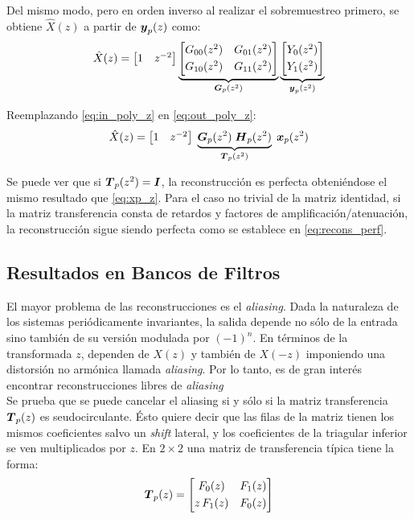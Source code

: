 		Del mismo modo, pero en orden inverso al realizar el sobremuestreo primero, se obtiene $\hat{X}(z)$ a partir de $\boldsymbol{y}_p(z)$ como:
		\begin{equation}
		\hat{X}(z) = \begin{bmatrix} 1 & z^{-2} \end{bmatrix} \underbrace{\begin{bmatrix} G_{00}(z^2) & G_{01}(z^2) \\[0.3em] G_{10}(z^2) & G_{11}(z^2) \end{bmatrix}}_{\boldsymbol{G}_p(z^2)} \underbrace{\begin{bmatrix} Y_0(z^2)\\[0.3em] Y_1(z^2) \end{bmatrix}}_{\boldsymbol{y}_p(z^2)} 
			\label{eq:out_poly_z}
		\end{equation}

		Reemplazando \eqref{eq:in_poly_z} en \eqref{eq:out_poly_z}:
		\begin{equation*}
		\hat{X}(z) = \begin{bmatrix} 1 & z^{-2} \end{bmatrix}\; \underbrace{\boldsymbol{G}_p(z^2) \; \boldsymbol{H}_p(z^2)}_{\boldsymbol{T}_p(z^2)} \; \boldsymbol{x}_p(z^2)
		\end{equation*}

		Se puede ver que si $\boldsymbol{T}_p(z^2) = \boldsymbol{I}$, la reconstrucción es perfecta obteniéndose el mismo resultado que \eqref{eq:xp_z}. Para el caso no trivial de la matriz identidad, si la matriz transferencia consta de retardos y factores de amplificación/atenuación, la reconstrucción sigue siendo perfecta como se establece en \eqref{eq:recons_perf}.

	\subsection{Resultados en Bancos de Filtros}
	El mayor problema de las reconstrucciones es el \emph{aliasing}. Dada la naturaleza de los sistemas periódicamente invariantes, la salida depende no sólo de la entrada sino también de su versión modulada por $(-1)^n$. En términos de la transformada $z$, dependen de $X(z)$ y también de $X(-z)$ imponiendo una distorsión no armónica llamada \emph{aliasing}. Por lo tanto, es de gran interés encontrar reconstrucciones libres de \emph{aliasing}\\

		Se prueba que se puede cancelar el aliasing si y sólo si la matriz transferencia $\boldsymbol{T}_p(z)$ es seudocirculante. Ésto quiere decir que las filas de la matriz tienen los mismos coeficientes salvo un \emph{shift} lateral, y los coeficientes de la triagular inferior se ven multiplicados por $z$. En $2\times 2$ una matriz de transferencia típica tiene la forma:
		\begin{equation*}
		\boldsymbol{T}_p(z) = \begin{bmatrix} F_0 (z) & F_1(z) \\[0.3em] z\, F_1(z) & F_0(z) \end{bmatrix}
		\end{equation*}
			
